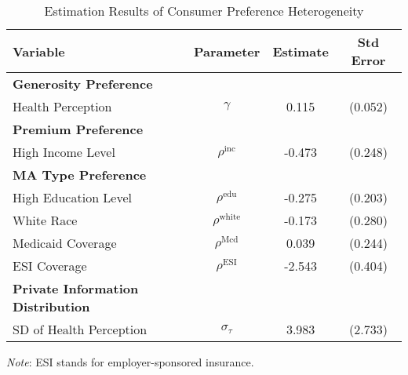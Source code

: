 
\begin{table}[ht]\footnotesize
    \centering
    \caption{Estimation Results of Consumer Preference Heterogeneity}
    \label{tab:demand_result_1}
    \begin{tabular}{lccc}
        \toprule
        \textbf{Variable} & \textbf{Parameter} & \textbf{Estimate} & \textbf{Std Error} \\
        \midrule
        \textbf{Generosity Preference} & & & \\
        Health Perception & $\gamma$ & 0.115 & (0.052) \\
        \midrule
        \textbf{Premium Preference} & & & \\
        High Income Level & $\rho^{\text{inc}}$ & -0.473 & (0.248) \\
        \midrule
        \textbf{MA Type Preference} & & & \\
        High Education Level & $\rho^{\text{edu}}$ & -0.275 & (0.203) \\
        White Race & $\rho^{\text{white}}$ & -0.173 & (0.280) \\
        Medicaid Coverage & $\rho^{\text{Mcd}}$ & 0.039 & (0.244) \\
        ESI Coverage & $\rho^{\text{ESI}}$ & -2.543 & (0.404) \\
        \midrule
         \textbf{Private Information Distribution} & & & \\
        SD of Health Perception & $\sigma_{\tau}$ & 3.983 & (2.733) \\
        \bottomrule
    \end{tabular}
    \begin{threeparttable}
        \begin{tablenotes}\footnotesize
            \item \textit{Note}: ESI stands for employer-sponsored insurance.
        \end{tablenotes}
    \end{threeparttable}
\end{table}

